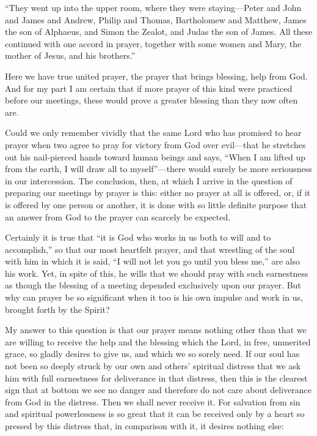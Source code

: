 “They went up into the upper room, where they were staying—Peter and John and James and Andrew, Philip and Thomas, Bartholomew and Matthew, James the son of Alphaeus, and Simon the Zealot, and Judas the son of James. All these continued with one accord in prayer, together with some women and Mary, the mother of Jesus, and his brothers.”

Here we have true united prayer, the prayer that brings blessing, help from God. And for my part I am certain that if more prayer of this kind were practiced before our meetings, these would prove a greater blessing than they now often are.

Could we only remember vividly that the same Lord who has promised to hear prayer when two agree to pray for victory from God over evil—that he stretches out his nail-pierced hands toward human beings and says, “When I am lifted up from the earth, I will draw all to myself”—there would surely be more seriousness in our intercession. The conclusion, then, at which I arrive in the question of preparing our meetings by prayer is this: either no prayer at all is offered, or, if it is offered by one person or another, it is done with so little definite purpose that an answer from God to the prayer can scarcely be expected.

Certainly it is true that “it is God who works in us both to will and to accomplish,” so that our most heartfelt prayer, and that wrestling of the soul with him in which it is said, “I will not let you go until you bless me,” are also his work. Yet, in spite of this, he wills that we should pray with such earnestness as though the blessing of a meeting depended exclusively upon our prayer. But why can prayer be so significant when it too is his own impulse and work in us, brought forth by the Spirit?

My answer to this question is that our prayer means nothing other than that we are willing to receive the help and the blessing which the Lord, in free, unmerited grace, so gladly desires to give us, and which we so sorely need. If our soul has not been so deeply struck by our own and others’ spiritual distress that we ask him with full earnestness for deliverance in that distress, then this is the clearest sign that at bottom we see no danger and therefore do not care about deliverance from God in the distress. Then we shall never receive it. For salvation from sin and spiritual powerlessness is so great that it can be received only by a heart so pressed by this distress that, in comparison with it, it desires nothing else:

